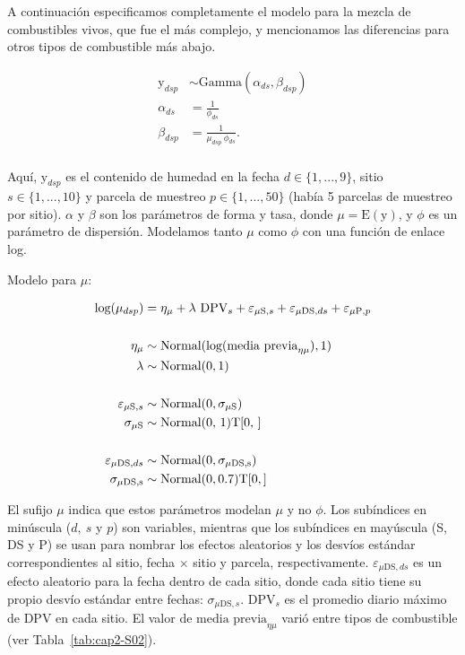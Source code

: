 A continuación especificamos completamente el modelo para la mezcla de combustibles vivos, que fue el más complejo, y mencionamos las diferencias para otros tipos de combustible más abajo.  

\[
\begin{aligned}
    \text{y}_{dsp} &\sim \text{Gamma}(\alpha_{ds}, \beta_{dsp})\\
    \alpha_{ds} &= \frac{1}{\phi_{ds}}\\
    \beta_{dsp} &= \frac{1}{\mu_{dsp} \ \phi_{ds}}.\\
\end{aligned}
\]

\noindent Aquí, $\text{y}_{dsp}$ es el contenido de humedad en la fecha $d \in \{1, ..., 9\}$, sitio $s \in \{1, ..., 10\}$ y parcela de muestreo $p \in \{1, ..., 50\}$ (había 5 parcelas de muestreo por sitio). $\alpha$ y $\beta$ son los parámetros de forma y tasa, donde $\mu = \text{E}(\text{y})$, y $\phi$ es un parámetro de dispersión. Modelamos tanto $\mu$ como $\phi$ con una función de enlace log.  

Modelo para $\mu$:
  
\begin{equation}
    \begin{aligned}
    \text{log}(\mu_{dsp}) &= \eta_\mu + \lambda \ \text{DPV}_s + \varepsilon_{\mu \text{S}, s} + \varepsilon_{\mu \text{DS}, ds} + \varepsilon_{\mu \text{P}, p}\\
    \\
    \eta_{\mu} &\sim \text{Normal}(\text{log}(\text{media previa}_{\eta \mu}), 1) \\
    \lambda &\sim \text{Normal}(0, 1) \\
    \\
    \varepsilon_{\mu \text{S}, s} &\sim \text{Normal}(0, \sigma_{\mu \text{S}}) \\ 
    \sigma_{\mu \text{S}} &\sim \text{Normal(0, 1)\text{T}[0, ]} \\
    \\
    \varepsilon_{\mu \text{DS}, ds} &\sim \text{Normal}(0, \sigma_{\mu \text{DS,s}}) \\
    \sigma_{\mu \text{DS,s}} &\sim \text{Normal}(0, 0.7)\text{T}[0, ] \\
    \end{aligned}
\end{equation}

\noindent El sufijo $\mu$ indica que estos parámetros modelan $\mu$ y no $\phi$. Los subíndices en minúscula ($d,\ s$ y $p$) son variables, mientras que los subíndices en mayúscula (S, DS y P) se usan para nombrar los efectos aleatorios y los desvíos estándar correspondientes al sitio, fecha $\times$ sitio y parcela, respectivamente. $\varepsilon_{\mu \text{DS}, ds}$ es un efecto aleatorio para la fecha dentro de cada sitio, donde cada sitio tiene su propio desvío estándar entre fechas: $\sigma_{\mu \text{DS},s}$.  
$\text{DPV}_s$ es el promedio diario máximo de DPV en cada sitio. El valor de $\text{media previa}_{\eta \mu}$ varió entre tipos de combustible (ver Tabla~\ref{tab:cap2-S02}).  
  

